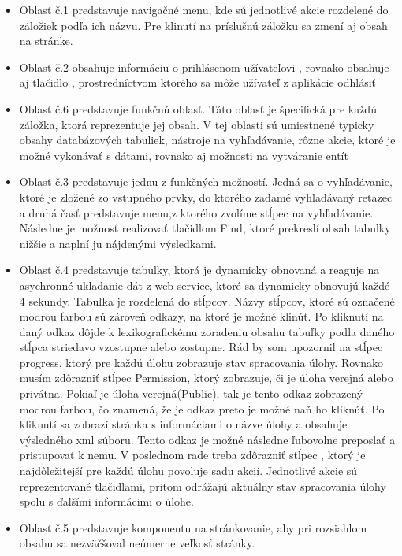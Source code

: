 \begin{itemize}
\item Oblasť č.1 predstavuje navigačné menu, kde sú jednotlivé akcie rozdelené do záložiek podľa ich názvu. Pre klinutí na príslušnú záložku sa zmení aj obsah na stránke. 
\item Oblasť č.2 obsahuje informáciu o prihlásenom užívateľovi , rovnako obsahuje aj tlačidlo , prostredníctvom ktorého sa môže užívateľ z aplikácie odhlásiť
\item Oblasť č.6 predstavuje funkčnú oblasť. Táto oblasť je špecifická pre každú záložka, ktorá reprezentuje jej obsah. V tej oblasti sú umiestnené typicky obsahy databázových tabuliek, nástroje na vyhľadávanie, rôzne akcie, ktoré je možné vykonávať s dátami, rovnako aj možnosti na vytváranie entít
\item Oblasť č.3 predstavuje jednu z funkčných možností. Jedná sa o vyhľadávanie, ktoré je zložené zo vstupného prvky, do ktorého zadamé vyhľadávaný reťazec a druhá časť predstavuje menu,z ktorého zvolíme stĺpec na vyhľadávanie. Následne je možnosť realizovať tlačidlom Find, ktoré prekreslí obsah tabulky nižšie a naplní ju nájdenými výsledkami.
\item Oblasť č.4 predstavuje tabulky, ktorá je dynamicky obnovaná a reaguje na asychronné ukladanie dát z web service, ktoré sa dynamicky obnovujú každé 4 sekundy. Tabuľka je rozdelená do stĺpcov. Názvy stĺpcov, ktoré sú označené modrou farbou sú zároveň odkazy, na ktoré je možné klinúť. Po kliknutí na daný odkaz dôjde k lexikografickému zoradeniu obsahu tabuľky podla daného stĺpca striedavo vzostupne alebo zostupne. Rád by som upozornil na stĺpec progress, ktorý pre každú úlohu zobrazuje stav spracovania úlohy. Rovnako musím zdôrazniť stĺpec Permission, ktorý zobrazuje, či je úloha verejná alebo privátna. Pokiaľ je úloha verejná(Public), tak je tento odkaz zobrazený modrou farbou, čo znamená, že je odkaz preto je možné naň ho kliknúť. Po kliknutí sa zobrazí stránka s informáciami o názve úlohy a obsahuje výsledného xml súboru. Tento odkaz je možné následne ľubovolne preposlať a pristupovať k nemu. V poslednom rade treba zdôrazniť stĺpec , ktorý je najdôležitejší pre každú úlohu povoluje sadu akcií. Jednotlivé akcie sú reprezentované tlačidlami, pritom odrážajú aktuálny stav spracovania úlohy spolu s ďalšími informácimi o úlohe.
\item Oblasť č.5 predstavuje komponentu na stránkovanie, aby pri rozsiahlom obsahu sa nezväčšoval neúmerne veľkosť stránky.


\end{itemize}

